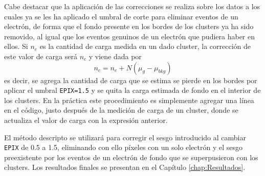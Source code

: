 Cabe destacar que la aplicación de las correcciones se realiza sobre los datos a los cuales ya se les ha aplicado el umbral de corte para eliminar eventos de un electrón, de forma que el fondo presente en los bordes de los clusters ya ha sido removido, al igual que los eventos genuinos de un electrón que pudiera haber en ellos. Si $n_{e}$ es la cantidad de carga medida en un dado cluster, la corrección de este valor de carga será $n_{c}$ y viene dada por
\begin{equation*}
    n_{c} = n_{e} + N(\mu_{g} - \mu_{bkg})
\end{equation*}
es decir, se agrega la cantidad de carga que se estima se pierde en los bordes por aplicar el umbral \verb|EPIX=1.5| y se quita la carga estimada de fondo en el interior de los clusters. En la práctica este procedimiento es simplemente agregar una línea en el código, justo después de la medición de carga de un cluster, donde se actualiza el valor de carga con la expresión anterior.

El método descripto se utilizará para corregir el sesgo introducido al cambiar \verb|EPIX| de 0.5 a 1.5, eliminando con ello píxeles con un solo electrón y el sesgo preexistente por los eventos de un electrón de fondo que se superpusieron con los clusters. Los resultados finales se presentan en el Capítulo \ref{chap:Resultados}.